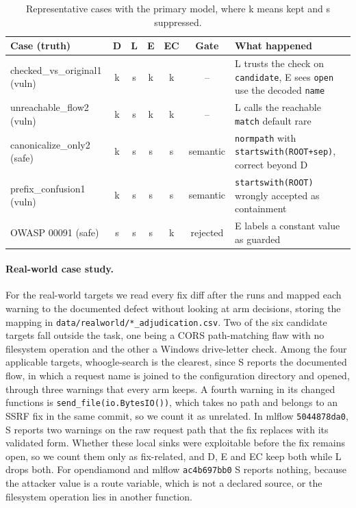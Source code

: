 \begin{table}[t]
\caption{Representative cases with the primary model, where k means kept and s suppressed.}
\label{tab:cases}
\small
\begin{tabular}{lcccccl}
\toprule
Case (truth) & D & L & E & EC & Gate & What happened \\
\midrule
checked\_vs\_original1 (vuln) & k & s & k & k & -- & L trusts the check on \texttt{candidate}, E sees \texttt{open} use the decoded \texttt{name} \\
unreachable\_flow2 (vuln) & k & s & k & k & -- & L calls the reachable \texttt{match} default rare \\
canonicalize\_only2 (safe) & k & s & s & s & semantic & \texttt{normpath} with \texttt{startswith(ROOT+sep)}, correct beyond D \\
prefix\_confusion1 (vuln) & k & s & s & s & semantic & \texttt{startswith(ROOT)} wrongly accepted as containment \\
OWASP 00091 (safe) & s & s & s & k & rejected & E labels a constant value as guarded \\
\bottomrule
\end{tabular}
\end{table}

\paragraph{Real-world case study.}
For the real-world targets we read every fix diff after the runs and mapped each warning to the documented defect without looking at arm decisions, storing the mapping in \texttt{data/realworld/*\_adjudication.csv}. Two of the six candidate targets fall outside the task, one being a CORS path-matching flaw with no filesystem operation and the other a Windows drive-letter check. Among the four applicable targets, whoogle-search is the clearest, since S reports the documented flow, in which a request name is joined to the configuration directory and opened, through three warnings that every arm keeps. A fourth warning in its changed functions is \texttt{send\_file(io.BytesIO())}, which takes no path and belongs to an SSRF fix in the same commit, so we count it as unrelated. In mlflow \texttt{5044878da0}, S reports two warnings on the raw request path that the fix replaces with its validated form. Whether these local sinks were exploitable before the fix remains open, so we count them only as fix-related, and D, E and EC keep both while L drops both. For opendiamond and mlflow \texttt{ac4b697bb0} S reports nothing, because the attacker value is a route variable, which is not a declared source, or the filesystem operation lies in another function.

